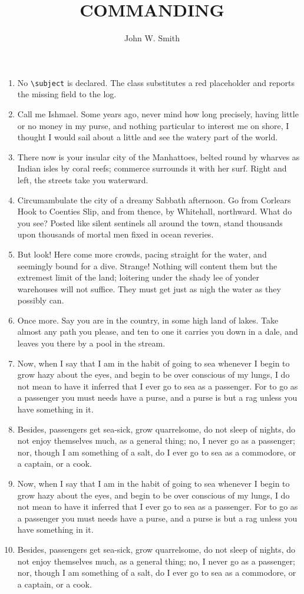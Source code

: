 \documentclass{../armymemo}
\author{John W. Smith}\rank{CPT}\branch{CY}
\title{COMMANDING}
\begin{document}
\begin{enumerate}
	\item No \verb|\subject| is declared. The class substitutes a red placeholder and
	      reports the missing field to the log.
	\item Call me Ishmael. Some years ago, never mind how long precisely, having
	      little or no money in my purse, and nothing particular to interest me on shore,
	      I thought I would sail about a little and see the watery part of the world.
	\item There now is your insular city of the Manhattoes, belted round by wharves
	      as Indian isles by coral reefs; commerce surrounds it with her surf. Right and
	      left, the streets take you waterward.
	\item Circumambulate the city of a dreamy Sabbath afternoon. Go from Corlears
	      Hook to Coenties Slip, and from thence, by Whitehall, northward. What do you
	      see? Posted like silent sentinels all around the town, stand thousands upon
	      thousands of mortal men fixed in ocean reveries.
	\item But look! Here come more crowds, pacing straight for the water, and
	      seemingly bound for a dive. Strange! Nothing will content them but the extremest
	      limit of the land; loitering under the shady lee of yonder warehouses will not
	      suffice. They must get just as nigh the water as they possibly can.
	\item Once more. Say you are in the country, in some high land of lakes. Take
	      almost any path you please, and ten to one it carries you down in a dale, and
	      leaves you there by a pool in the stream.
	\item Now, when I say that I am in the habit of going to sea whenever I begin to
	      grow hazy about the eyes, and begin to be over conscious of my lungs, I do not
	      mean to have it inferred that I ever go to sea as a passenger. For to go as a
	      passenger you must needs have a purse, and a purse is but a rag unless you have
	      something in it.
	\item Besides, passengers get sea-sick, grow quarrelsome, do not sleep of nights,
	      do not enjoy themselves much, as a general thing; no, I never go as a passenger;
	      nor, though I am something of a salt, do I ever go to sea as a commodore, or a
	      captain, or a cook.
	\item Now, when I say that I am in the habit of going to sea whenever I begin to
	      grow hazy about the eyes, and begin to be over conscious of my lungs, I do not
	      mean to have it inferred that I ever go to sea as a passenger. For to go as a
	      passenger you must needs have a purse, and a purse is but a rag unless you have
	      something in it.
	\item Besides, passengers get sea-sick, grow quarrelsome, do not sleep of nights,
	      do not enjoy themselves much, as a general thing; no, I never go as a passenger;
	      nor, though I am something of a salt, do I ever go to sea as a commodore, or a
	      captain, or a cook.
\end{enumerate}
\end{document}
